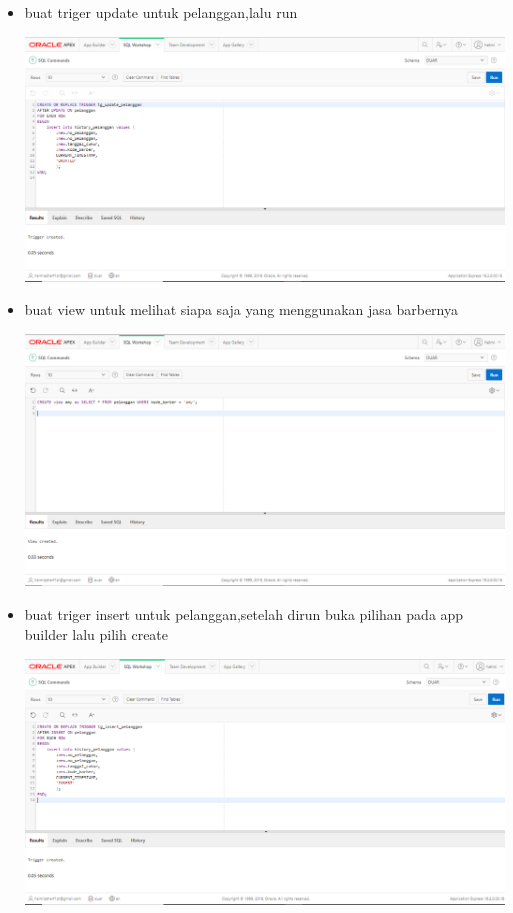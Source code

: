 ﻿\documentclass{article}
\begin{document}
\begin{itemize}
        \item buat triger update untuk pelanggan,lalu run
        \begin{center}
            \includegraphics[scale=0.3]{gambar/9.PNG}
        \end{center}
        
        \item buat view untuk melihat siapa saja yang menggunakan jasa barbernya
        \begin{center}
            \includegraphics[scale=0.3]{gambar/view.PNG}
        \end{center}
        
        \item buat triger insert untuk pelanggan,setelah dirun buka pilihan pada app builder lalu pilih create
        \begin{center}
            \centering
            \includegraphics[scale=0.3]{gambar/8.PNG}
        \end{center}
        

\end{itemize}
\end{document}
